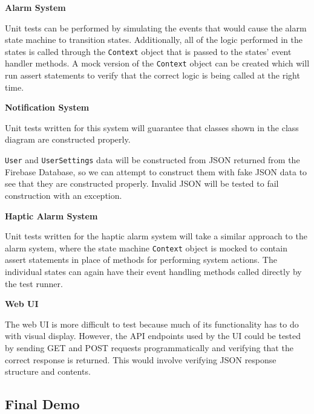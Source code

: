\textbf{Alarm System}

Unit tests can be performed by simulating the events that would cause the alarm state machine to transition states.
Additionally, all of the logic performed in the states is called through the \texttt{Context} object that is passed to
the states' event handler methods. A mock version of the \texttt{Context} object can be created which will run assert
statements to verify that the correct logic is being called at the right time.

\textbf{Notification System}

Unit tests written for this system will guarantee that classes shown in the class diagram are constructed properly.

\texttt{User} and \texttt{UserSettings} data will be constructed from JSON returned from the Firebase Database, so we
can attempt to construct them with fake JSON data to see that they are constructed properly. Invalid JSON will be tested
to fail construction with an exception.

\textbf{Haptic Alarm System}

Unit tests written for the haptic alarm system will take a similar approach to the alarm system, where the state
machine \texttt{Context} object is mocked to contain assert statements in place of methods for performing system
actions. The individual states can again have their event handling methods called directly by the test runner.

\textbf{Web UI}

The web UI is more difficult to test because much of its functionality has to do with visual display. However, the API
endpoints used by the UI could be tested by sending GET and POST requests programmatically and verifying that the
correct response is returned. This would involve verifying JSON response structure and contents.

\subsection{Final Demo}

